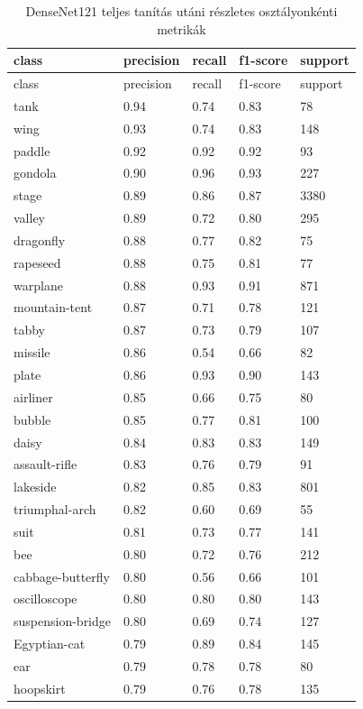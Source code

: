\begin{center}
\begin{longtable}{lllll}
\caption{DenseNet121 teljes tanítás utáni részletes osztályonkénti metrikák}\label{tab:phase2_DenseNet121_class_table}\\
\toprule
class & precision & recall & f1-score & support \\
\midrule
\endfirsthead
\toprule
class & precision & recall & f1-score & support \\
\midrule
\endhead
tank & 0.94 & 0.74 & 0.83 & 78 \\
wing & 0.93 & 0.74 & 0.83 & 148 \\
paddle & 0.92 & 0.92 & 0.92 & 93 \\
gondola & 0.90 & 0.96 & 0.93 & 227 \\
stage & 0.89 & 0.86 & 0.87 & 3380 \\
valley & 0.89 & 0.72 & 0.80 & 295 \\
dragonfly & 0.88 & 0.77 & 0.82 & 75 \\
rapeseed & 0.88 & 0.75 & 0.81 & 77 \\
warplane & 0.88 & 0.93 & 0.91 & 871 \\
mountain-tent & 0.87 & 0.71 & 0.78 & 121 \\
tabby & 0.87 & 0.73 & 0.79 & 107 \\
missile & 0.86 & 0.54 & 0.66 & 82 \\
plate & 0.86 & 0.93 & 0.90 & 143 \\
airliner & 0.85 & 0.66 & 0.75 & 80 \\
bubble & 0.85 & 0.77 & 0.81 & 100 \\
daisy & 0.84 & 0.83 & 0.83 & 149 \\
assault-rifle & 0.83 & 0.76 & 0.79 & 91 \\
lakeside & 0.82 & 0.85 & 0.83 & 801 \\
triumphal-arch & 0.82 & 0.60 & 0.69 & 55 \\
suit & 0.81 & 0.73 & 0.77 & 141 \\
bee & 0.80 & 0.72 & 0.76 & 212 \\
cabbage-butterfly & 0.80 & 0.56 & 0.66 & 101 \\
oscilloscope & 0.80 & 0.80 & 0.80 & 143 \\
suspension-bridge & 0.80 & 0.69 & 0.74 & 127 \\
Egyptian-cat & 0.79 & 0.89 & 0.84 & 145 \\
ear & 0.79 & 0.78 & 0.78 & 80 \\
hoopskirt & 0.79 & 0.76 & 0.78 & 135 \\

\end{longtable}
\end{center}
